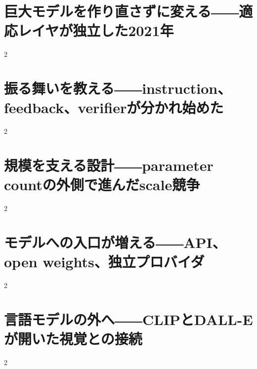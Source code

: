 \documentclass[lualatex,a4paper,11pt]{jlreq}
\begin{document}
\surveycover
\clearpage


\clearpage
\section{巨大モデルを作り直さずに変える――適応レイヤが独立した2021年}
\label{pkg:adaptation-efficient-tuning}

\medskip
\begin{multicols}{2}

\end{multicols}


\clearpage
\section{振る舞いを教える――instruction、feedback、verifierが分かれ始めた}
\label{pkg:instruction-human-feedback}

\medskip
\begin{multicols}{2}

\end{multicols}


\clearpage
\section{規模を支える設計――parameter countの外側で進んだscale競争}
\label{pkg:scale-sparse-systems}

\medskip
\begin{multicols}{2}

\end{multicols}


\clearpage
\section{モデルへの入口が増える――API、open weights、独立プロバイダ}
\label{pkg:access-distribution}

\medskip
\begin{multicols}{2}

\end{multicols}


\clearpage
\section{言語モデルの外へ――CLIPとDALL-Eが開いた視覚との接続}
\label{pkg:multimodal-substrate}

\medskip
\begin{multicols}{2}

\end{multicols}

\end{document}
